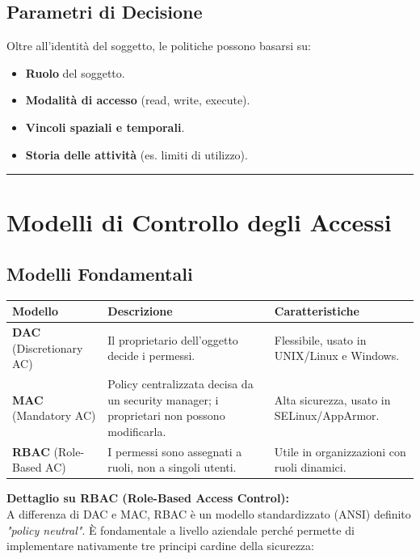 \documentclass[12pt, a4paper]{report}
\begin{document}
\subsection{Parametri di Decisione}
Oltre all'identità del soggetto, le politiche possono basarsi su:
\begin{itemize}
	\item \textbf{Ruolo} del soggetto.
	\item \textbf{Modalità di accesso} (read, write, execute).
	\item \textbf{Vincoli spaziali e temporali}.
	\item \textbf{Storia delle attività} (es. limiti di utilizzo).
\end{itemize}

\noindent\rule{\textwidth}{0.4pt}

\section{Modelli di Controllo degli Accessi}

\subsection{Modelli Fondamentali}

\begin{table}[H]
	\centering
	\begin{tabular}{|l|p{6cm}|p{5cm}|}
		\hline
		\textbf{Modello} & \textbf{Descrizione} & \textbf{Caratteristiche} \\ \hline
		\textbf{DAC} (Discretionary AC) & Il proprietario dell'oggetto decide i permessi. & Flessibile, usato in UNIX/Linux e Windows. \\ \hline
		\textbf{MAC} (Mandatory AC) & Policy centralizzata decisa da un security manager; i proprietari non possono modificarla. & Alta sicurezza, usato in SELinux/AppArmor. \\ \hline
		\textbf{RBAC} (Role-Based AC) & I permessi sono assegnati a ruoli, non a singoli utenti. & Utile in organizzazioni con ruoli dinamici. \\ \hline
	\end{tabular}
\end{table}

\textbf{Dettaglio su RBAC (Role-Based Access Control):}\\
A differenza di DAC e MAC, RBAC è un modello standardizzato (ANSI) definito \textit{"policy neutral"}. È fondamentale a livello aziendale perché permette di implementare nativamente tre principi cardine della sicurezza:
\end{document}
